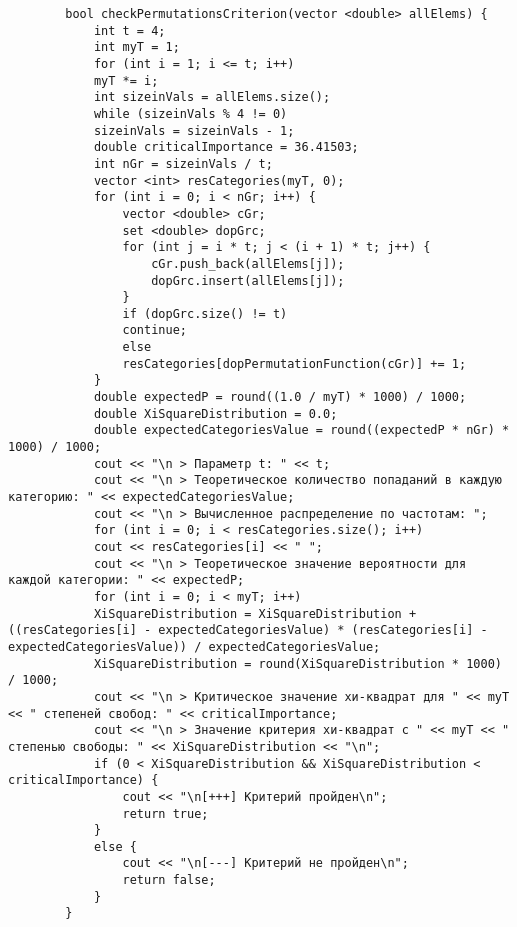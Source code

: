 \documentclass[bachelor, och, coursework]{shiza}
\begin{document}
\begin{verbatim}
		bool checkPermutationsCriterion(vector <double> allElems) {
			int t = 4;
			int myT = 1;
			for (int i = 1; i <= t; i++)
			myT *= i;
			int sizeinVals = allElems.size();
			while (sizeinVals % 4 != 0)
			sizeinVals = sizeinVals - 1;
			double criticalImportance = 36.41503;
			int nGr = sizeinVals / t;
			vector <int> resCategories(myT, 0);
			for (int i = 0; i < nGr; i++) {
				vector <double> cGr;
				set <double> dopGrc;
				for (int j = i * t; j < (i + 1) * t; j++) {
					cGr.push_back(allElems[j]);
					dopGrc.insert(allElems[j]);
				}
				if (dopGrc.size() != t)
				continue;
				else
				resCategories[dopPermutationFunction(cGr)] += 1;
			}
			double expectedP = round((1.0 / myT) * 1000) / 1000;
			double XiSquareDistribution = 0.0;
			double expectedCategoriesValue = round((expectedP * nGr) * 1000) / 1000;
			cout << "\n > Параметр t: " << t;
			cout << "\n > Теоретическое количество попаданий в каждую категорию: " << expectedCategoriesValue;
			cout << "\n > Вычисленное распределение по частотам: ";
			for (int i = 0; i < resCategories.size(); i++)
			cout << resCategories[i] << " ";
			cout << "\n > Теоретическое значение вероятности для каждой категории: " << expectedP;
			for (int i = 0; i < myT; i++)
			XiSquareDistribution = XiSquareDistribution + ((resCategories[i] - expectedCategoriesValue) * (resCategories[i] - expectedCategoriesValue)) / expectedCategoriesValue;
			XiSquareDistribution = round(XiSquareDistribution * 1000) / 1000;
			cout << "\n > Критическое значение хи-квадрат для " << myT << " степеней свобод: " << criticalImportance;
			cout << "\n > Значение критерия хи-квадрат с " << myT << " степенью свободы: " << XiSquareDistribution << "\n";
			if (0 < XiSquareDistribution && XiSquareDistribution < criticalImportance) {
				cout << "\n[+++] Критерий пройден\n";
				return true;
			}
			else {
				cout << "\n[---] Критерий не пройден\n";
				return false;
			}
		}
		

\end{verbatim}
\end{document}
